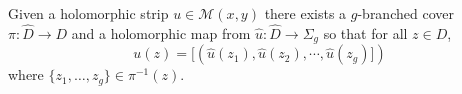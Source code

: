 

    Given a holomorphic strip $u\in \mathcal M(x, y)$ there exists a $g$-branched cover
    $\pi: \hat D\to D$ 
    and a holomorphic map from $\hat u: \hat D \to \Sigma_g$ so that for all $z\in D$, 
    \[u(z)=[(\hat u(z_1), \hat u(z_2), \cdots , \hat u(z_g)])\]
    where $\{z_1, \ldots, z_g\}\in \pi^{-1}(z)$.
